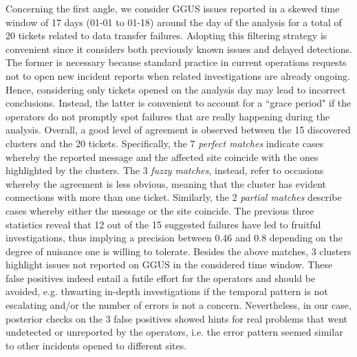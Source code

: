 \begin{table}%
\centering
{}
\caption{Summary of pre-validation results.}
\label{tab:cross-check}
\end{table}

Concerning the first angle, we consider GGUS issues reported in a skewed time window of 17 days (01-01 to 01-18) around the day of the analysis for a total of 20 tickets related to data transfer failures.
Adopting this filtering strategy is convenient since it considers both previously known issues and delayed detections.
The former is necessary because standard practice in current operations requests not to open new incident reports when related investigations are already ongoing. Hence, considering only tickets opened on the analysis day may lead to incorrect conclusions.
Instead, the latter is convenient to account for a ``grace period" if the operators do not promptly spot failures that are really happening during the analysis.
Overall, a good level of agreement is observed between the 15 discovered clusters and the 20 tickets.
Specifically, the 7 \textit{perfect matches} indicate cases whereby the reported message and the affected site coincide with the ones highlighted by the clusters.
The 3 \textit{fuzzy matches}, instead, refer to occasions whereby the agreement is less obvious, meaning that the cluster has evident connections with more than one ticket.
Similarly, the 2 \textit{partial matches} describe cases whereby either the message or the site coincide. 
The previous three statistics reveal that 12 out of the 15 suggested failures have led to fruitful investigations, thus implying a precision between 0.46 and 0.8 depending on the degree of nuisance one is willing to tolerate. 
Besides the above matches, 3 clusters highlight issues not reported on GGUS in the considered time window.
These false positives indeed entail a futile effort for the operators and should be avoided, e.g. thwarting in-depth investigations 
if the temporal pattern is not escalating and/or the number of errors is not a concern.
Nevertheless, in our case, posterior checks on the 3 false positives showed hints for real problems that went undetected or unreported by the operators, i.e. the error pattern seemed similar to other incidents opened to different sites.

